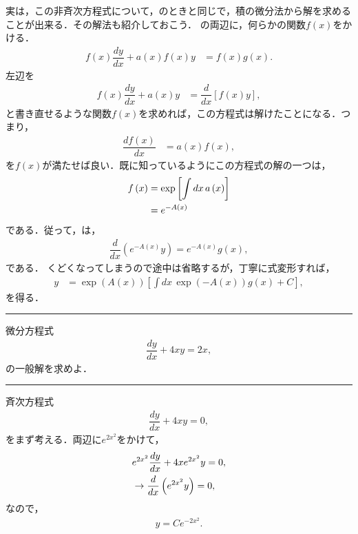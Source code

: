 実は，この非斉次方程式について，のときと同じで，積の微分法から解を求めることが出来る．その解法も紹介しておこう．
の両辺に，何らかの関数$f\left(x\right)$をかける．
\begin{align}
 f\left(x\right)\dfrac{dy}{dx}+a\left(x\right)f\left(x\right)y & =f(x)g\left(x\right).
 \label{eq:PDE_06_fx}
\end{align}
左辺を
\begin{align}
  f\left(x\right)\dfrac{dy}{dx}+a\left(x\right)y & =\dfrac{d}{dx}\left[f\left(x\right)y\right],
\end{align}
と書き直せるような関数$f\left(x\right)$を求めれば，この方程式は解けたことになる．つまり，
\begin{align}
 \dfrac{df\left(x\right)}{dx} & =a\left(x\right)f\left(x\right),
\end{align}
を$f\left(x\right)$が満たせば良い．既に知っているようにこの方程式の解の一つは，
\begin{align}
 f\left(x\right) & =\exp\left[\int dx\,a\left(x\right)\right]\notag \\ 
                 & =e^{-A\left(x\right)}
\end{align}
である．従って，は，
\begin{align}
 \dfrac{d}{dx}\left(e^{-A\left(x\right)}y\right) = e^{-A\left(x\right)}g\left(x\right), 
\end{align}
である．
くどくなってしまうので途中は省略するが，丁寧に式変形すれば，
\begin{align}
 y & =\exp\left(A\left(x\right)\right)\left[\int dx\,\exp\left(-A\left(x\right)\right)g\left(x\right)+C\right],
\end{align}
を得る．
%
%
\newpage
%
\hrule
\reidai
微分方程式
\begin{align}
 \dfrac{dy}{dx} + 4x y= 2x,
\end{align}
の一般解を求めよ．
\vspace*{.2cm}
\hrule
\vspace*{.2cm}
%
斉次方程式
\begin{align}
  \dfrac{dy}{dx} + 4xy = 0, 
\end{align}
をまず考える．両辺に$e^{2x^2}$をかけて，
\begin{align}
  &e^{2x^2}\dfrac{dy}{dx} + 4xe^{2x^2} y = 0, \notag \\
  &\rightarrow \dfrac{d}{dx}\left(e^{2x^2}y\right) = 0,
\end{align}
なので，
\begin{align}
  y = Ce^{-2x^2}. 
\end{align}
